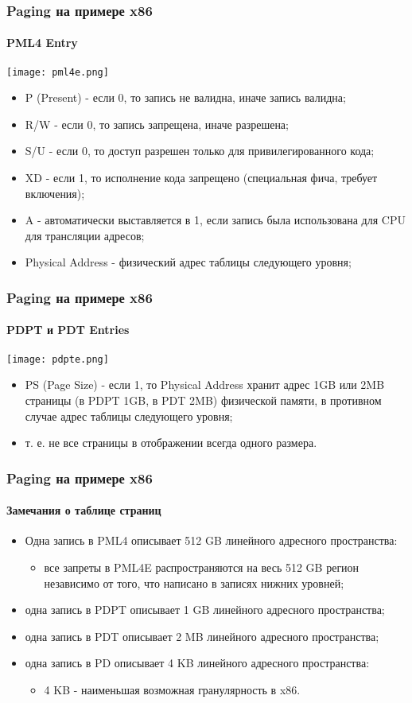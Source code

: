 \begin{frame}
\frametitle{Paging на примере x86}
\framesubtitle{PML4 Entry}
\begin{center}
  \texttt{[image: pml4e.png]}
\end{center}
\begin{itemize}
  \item P (Present) - если 0, то запись не валидна, иначе запись валидна;
  \item R/W - если 0, то запись запрещена, иначе разрешена;
  \item S/U - если 0, то доступ разрешен только для привилегированного кода;
  \item XD - если 1, то исполнение кода запрещено (специальная фича, требует
  включения);
  \item A - автоматически выставляется в 1, если запись была использована для
  CPU для трансляции адресов;
  \item Physical Address - физический адрес таблицы следующего уровня;
\end{itemize}
\end{frame}

\begin{frame}
\frametitle{Paging на примере x86}
\framesubtitle{PDPT и PDT Entries}
\begin{center}
  \texttt{[image: pdpte.png]}
\end{center}
\begin{itemize}
  \item PS (Page Size) - если 1, то Physical Address хранит адрес 1GB или 2MB
  страницы (в PDPT 1GB, в PDT 2MB) физической памяти, в противном случае адрес
  таблицы следующего уровня;
  \item т. е. не все страницы в отображении всегда одного размера.
\end{itemize}
\end{frame}

\begin{frame}
\frametitle{Paging на примере x86}
\framesubtitle{Замечания о таблице страниц}
\begin{itemize}
  \item Одна запись в PML4 описывает 512 GB линейного адресного пространства:
  \begin{itemize}
    \item все запреты в PML4E распространяются на весь 512 GB регион независимо
    от того, что написано в записях нижних уровней;
  \end{itemize}
  \item одна запись в PDPT описывает 1 GB линейного адресного пространства;
  \item одна запись в PDT описывает 2 MB линейного адресного пространства;
  \item одна запись в PD описывает 4 KB линейного адресного пространства:
  \begin{itemize}
    \item 4 KB - наименьшая возможная гранулярность в x86.
  \end{itemize}
\end{itemize}
\end{frame}


